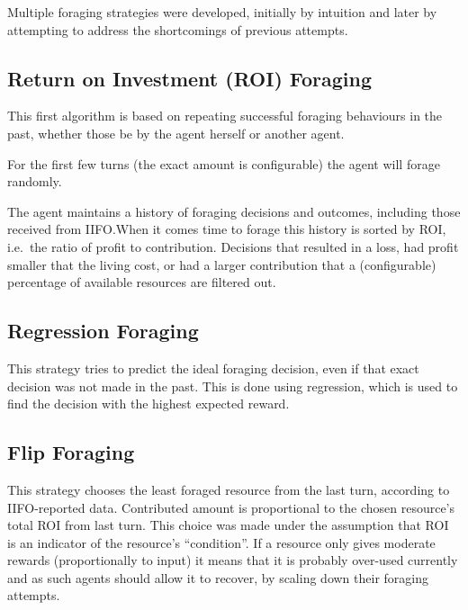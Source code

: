 Multiple foraging strategies were developed, initially by intuition and later by attempting to address the shortcomings of previous attempts.

\subsection{Return on Investment (ROI) Foraging}%
\label{sec:forage-roi}

This first algorithm is based on repeating successful foraging behaviours in the past, whether those be by the agent herself or another agent.

For the first few turns (the exact amount is configurable) the agent will forage randomly.

The agent maintains a history of foraging decisions and outcomes, including those received from IIFO.\@ When it comes time to forage this history is sorted by ROI, i.e.\ the ratio of profit to contribution. Decisions that resulted in a loss, had profit smaller that the living cost, or had a larger contribution that a (configurable) percentage of available resources are filtered out.

\subsection{Regression Foraging}%
\label{sec:forage-regression}

This strategy tries to predict the ideal foraging decision, even if that exact decision was not made in the past. This is done using regression, which is used to find the decision with the highest expected reward.


\subsection{Flip Foraging}

This strategy chooses the least foraged resource from the last turn, according to IIFO-reported data. Contributed amount is proportional to the chosen resource's total ROI from last turn. This choice was made under the assumption that ROI is an indicator of the resource's ``condition''. If a resource only gives moderate rewards (proportionally to input) it means that it is probably over-used currently and as such agents should allow it to recover, by scaling down their foraging attempts.

